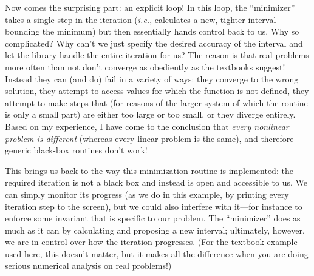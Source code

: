 Now comes the surprising part: an explicit loop! In this loop, the
``minimizer'' takes a single step in the iteration ({\it i.e.}, 
calculates a new, tighter interval bounding the minimum) but then
essentially hands control back to us. Why so complicated? Why can't we
just specify the desired accuracy of the interval and let the library
handle the entire iteration for us? The reason is that real problems
more often than not don't converge as obediently as the textbooks
suggest! Instead they can (and do) fail in a variety of ways: they
converge to the wrong solution, they attempt to access values for
which the function is not defined, they attempt to make steps that
(for reasons of the larger system of which the routine is only a small
part) are either too large or too small, or they diverge entirely.
Based on my experience, I have come to the conclusion that \emph{every
  nonlinear problem is different} (whereas every linear problem is the
same), and therefore generic black-box routines don't work!

This brings us back to the way this minimization routine is
implemented: the required iteration is not a black box and instead is
open and accessible to us. We can simply monitor its progress (as we
do in this example, by printing every iteration step to the screen),
but we could also interfere with it---for instance to enforce some
invariant that is specific to our problem. The ``minimizer'' does as
much as it can by calculating and proposing a new interval;
ultimately, however, we are in control over how the iteration
progresses. (For the textbook example used here, this doesn't matter,
but it makes all the difference when you are doing serious numerical
analysis on real problems!)\vspace*{9pt}


